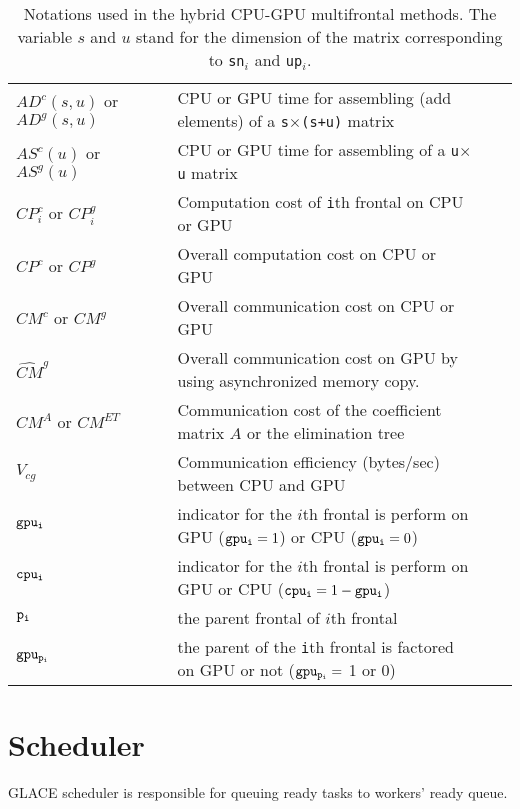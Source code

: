 \documentclass[preprint,11pt]{elsarticle}
\begin{document}
\begin{table}
{\begin{tabular}{lllll}
    $AD^c(s, u)$ or $AD^g(s, u)$   && CPU or GPU time for assembling (add elements) of a {\tt s}$\times${\tt (s+u)} matrix \\
    $AS^c(u)$ or $AS^g(u)$   && CPU or GPU time for assembling of a {\tt u}$\times${\tt u} matrix \\ \hline

    $CP^c_i$ or $CP^g_i$ && Computation cost of {\tt i}th frontal on CPU or GPU\\
    $CP^c$ or $CP^g$ && Overall computation cost on CPU or GPU\\ \hline

    $CM^c$ or $CM^{g}$ && Overall communication cost  on CPU or GPU\\
    $ \widehat{CM}^{g}$ && Overall communication cost  on GPU by using asynchronized memory copy. \\
    $CM^A$ or $CM^{ET}$ && Communication cost of the coefficient matrix $A$ or
the elimination tree\\

    {\tt $V_{cg}$} && Communication efficiency (bytes/sec) between CPU and GPU \\ \hline

    ${\tt gpu_i}$ && indicator for the $i$th frontal is perform on GPU
(${\tt gpu_i}=1$) or CPU (${\tt gpu_i}=0$)\\
    ${\tt cpu_i}$ && indicator for the $i$th frontal is perform on GPU or CPU (${\tt cpu_i}=1-{\tt gpu_i}$)\\
    ${\tt p_i}$ && the parent frontal of $i$th frontal\\
    ${\tt gpu_{p_i}}$ &&  the parent of the {\tt i}th frontal is factored on GPU or not (${\tt gpu_{p_i}}=$ 1 or 0)\\
    \hline
  \end{tabular}
}
\caption{Notations used in the hybrid CPU-GPU multifrontal methods.
  The variable $s$ and $u$ stand for the dimension of the matrix corresponding 
  to {\tt sn$_i$} and {\tt up$_i$}.}
  \label{tab:notation}
\end{table}

\section{Scheduler}
  GLACE scheduler is responsible for queuing ready tasks to workers' ready queue. 
\end{document}
